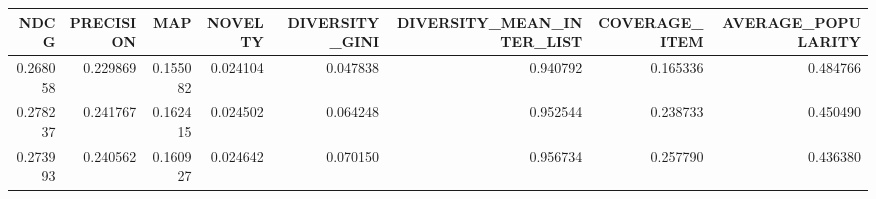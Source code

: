 \begin{tabular}{rrrrrrrr}
\toprule
    NDCG &  PRECISION &      MAP &  NOVELTY &  DIVERSITY\_GINI &  DIVERSITY\_MEAN\_INTER\_LIST &  COVERAGE\_ITEM &  AVERAGE\_POPULARITY \\
\midrule
0.268058 &   0.229869 & 0.155082 & 0.024104 &        0.047838 &                   0.940792 &       0.165336 &            0.484766 \\
0.278237 &   0.241767 & 0.162415 & 0.024502 &        0.064248 &                   0.952544 &       0.238733 &            0.450490 \\
0.273993 &   0.240562 & 0.160927 & 0.024642 &        0.070150 &                   0.956734 &       0.257790 &            0.436380 \\
\bottomrule
\end{tabular}
